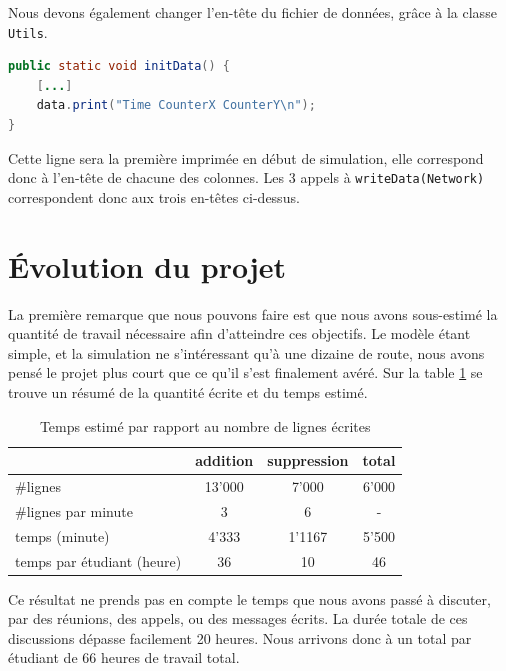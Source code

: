 \documentclass[a4paper,11pt, titlepage]{extarticle}
\begin{document}
Nous devons également changer l'en-tête du fichier de données, grâce à la classe \texttt{Utils}. 

\begin{lstlisting}[language=Java]
public static void initData() {
	[...]
	data.print("Time CounterX CounterY\n");
}
\end{lstlisting}

Cette ligne sera la première imprimée en début de simulation, elle correspond donc à l'en-tête de chacune des colonnes. Les 3 appels à \texttt{writeData(Network)} correspondent donc aux trois en-têtes ci-dessus.

\newpage

\section{Évolution du projet}

La première remarque que nous pouvons faire est que nous avons sous-estimé la quantité de travail nécessaire afin d'atteindre ces objectifs. Le modèle étant simple, et la simulation ne s'intéressant qu'à une dizaine de route, nous avons pensé le projet plus court que ce qu'il s'est finalement avéré. Sur la table \ref{tabTemps} se trouve un résumé de la quantité écrite et du temps estimé.

\begin{table}[h!]
\begin{center}
\begin{tabular}{|l|c|c|c|}
\hline
 & addition & suppression & total\\ \hline
\#lignes & 13'000 & 7'000 & 6'000\\ \hline
\#lignes par minute & 3 & 6 & - \\ \hline\hline
temps (minute) & 4'333 & 1'1167 & 5'500\\ \hline
temps par étudiant (heure) & 36 & 10 & 46\\ \hline
\end{tabular}
\end{center}
\caption{Temps estimé par rapport au nombre de lignes écrites}
\label{tabTemps}
\end{table}

Ce résultat ne prends pas en compte le temps que nous avons passé à discuter, par des réunions, des appels, ou des messages écrits. La durée totale de ces discussions dépasse facilement 20 heures. Nous arrivons donc à un total par étudiant de 66 heures de travail total.
\end{document}
